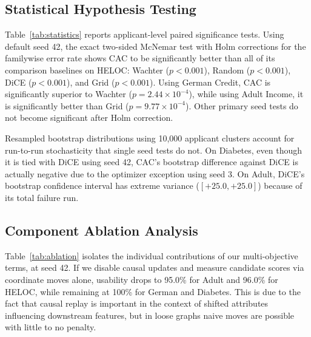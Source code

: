 \documentclass[nolineno]{paper/ieee-access/ieeeaccess}%
\newcommand{\CAC}{CAC}
\begin{document}
\begin{table}[t]
\caption{Paired applicant-level statistical significance tests and bootstrap confidence intervals. Paired differences and bootstrap percentile intervals are computed across shared random seeds; $p$-values reflect exact two-sided McNemar tests on seed 42 with Holm familywise error rate adjustment.}
\label{tab:statistics}
\centering\footnotesize

\end{table}

\subsection{Statistical Hypothesis Testing}
Table~\ref{tab:statistics} reports applicant-level paired significance tests. Using default seed 42, the exact two-sided McNemar test with Holm corrections for the familywise error rate shows \CAC{} to be significantly better than all of its comparison baselines on HELOC: Wachter ($p < 0.001$), Random ($p < 0.001$), DiCE ($p < 0.001$), and Grid ($p < 0.001$). Using German Credit, \CAC{} is significantly superior to Wachter ($p = 2.44 \times 10^{-4}$), while using Adult Income, it is significantly better than Grid ($p = 9.77 \times 10^{-4}$). Other primary seed tests do not become significant after Holm correction.

Resampled bootstrap distributions using 10,000 applicant clusters account for run-to-run stochasticity that single seed tests do not. On Diabetes, even though it is tied with DiCE using seed 42, \CAC{}'s bootstrap difference against DiCE is actually negative due to the optimizer exception using seed 3. On Adult, DiCE's bootstrap confidence interval has extreme variance ($[+25.0, +25.0]$) because of its total failure run.

\subsection{Component Ablation Analysis}
Table~\ref{tab:ablation} isolates the individual contributions of our multi-objective terms, at seed 42. If we disable causal updates and measure candidate scores via coordinate moves alone, usability drops to 95.0\% for Adult and 96.0\% for HELOC, while remaining at 100\% for German and Diabetes. This is due to the fact that causal replay is important in the context of shifted attributes influencing downstream features, but in loose graphs naive moves are possible with little to no penalty.
\end{document}
